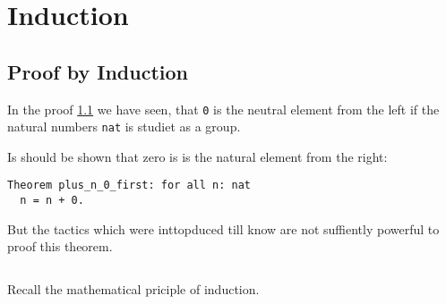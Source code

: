 \section{Induction}

\subsection{Proof by Induction}
In the proof \ref{} we have seen, 
that \lstinline!0! is the neutral element from the left if the natural numbers \lstinline!nat! is studiet as a group. 

Is should be shown that zero is is the natural element from the right:
\begin{lstlisting}
Theorem plus_n_0_first: for all n: nat
  n = n + 0.  
\end{lstlisting}

But the tactics which were inttopduced till know are not suffiently powerful to proof this theorem.

\begin{lstlisting}
\end{lstlisting}

Recall the mathematical priciple of induction.